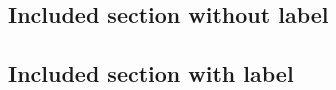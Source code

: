 \subsection{Included section without label}
\subsection{Included section with label}
\label{subsec:ok}
